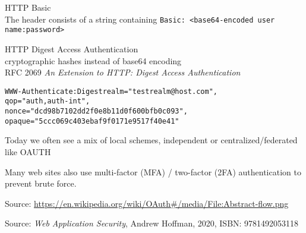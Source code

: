 \documentclass[Screen16to9,17pt]{foils}
\begin{document}
\begin{list2}
    \item\end{list2}




\begin{list2}
\item HTTP Basic \\
The header consists of a string containing \verb+Basic: <base64-encoded user name:password>+

\item HTTP Digest Access Authentication\\
cryptographic hashes instead of base64 encoding\\
RFC 2069 \emph{An Extension to HTTP: Digest Access Authentication}
\begin{alltt}\footnotesize
WWW-Authenticate: Digest realm="testrealm@host.com",
                        qop="auth,auth-int",
                        nonce="dcd98b7102dd2f0e8b11d0f600bfb0c093",
                        opaque="5ccc069c403ebaf9f0171e9517f40e41"
\end{alltt}
\item Today we often see a mix of local schemes, independent or centralized/federated like OAUTH\\

\item Many web sites also use multi-factor (MFA) / two-factor (2FA) authentication to prevent brute force.

\end{list2}


Source: \url{https://en.wikipedia.org/wiki/OAuth#/media/File:Abstract-flow.png}




Source: \emph{Web Application Security}, Andrew Hoffman, 2020, ISBN: 9781492053118



\end{document}
